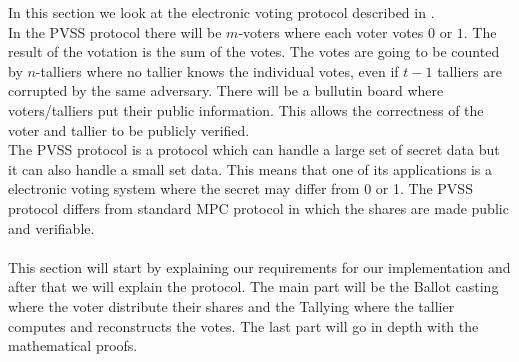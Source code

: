In this section we look at the electronic voting protocol described in \cite{Schoenmakers1999}. \\

\noindent
In the PVSS protocol there will be $m$-voters where each voter votes $0$ or $1$. The result of the votation is the sum of the votes. The votes are going to be counted by $n$-talliers where no tallier knows the individual votes, even if $t-1$ talliers are corrupted by the same adversary. There will be a bullutin board where voters/talliers put their public information. This allows the correctness of the voter and tallier to be publicly verified.\\

\noindent
The PVSS protocol is a protocol which can handle a large set of secret data but it can also handle a small set data. This means that one of its applications is a  electronic voting system where the secret may differ from 0 or 1. The PVSS protocol differs from standard MPC protocol in which the shares are made public and verifiable.\\\\
This section will start by explaining our requirements for our implementation and after that we will explain the protocol. The main part will be the Ballot casting where the voter distribute their shares and the Tallying where the tallier computes and reconstructs the votes. The last part will go in depth with the mathematical proofs. \\

\noindent

